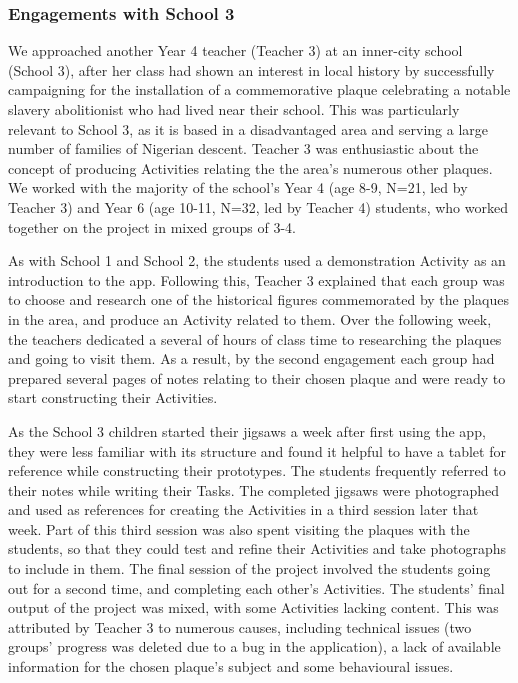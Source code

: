 \documentclass[,hyphens]{sigchi}
\begin{document}
\subsubsection{Engagements with School 3}
We approached another Year 4 teacher (Teacher 3) at an inner-city school (School 3), after her class had shown an interest in local history by successfully campaigning for the installation of a commemorative plaque celebrating a notable slavery abolitionist who had lived near their school. This was particularly relevant to School 3, as it is based in a disadvantaged area and serving a large number of families of Nigerian descent. Teacher 3 was enthusiastic about the concept of producing Activities relating the the area's numerous other plaques. We worked with the majority of the school's Year 4 (age 8-9, N=21, led by Teacher 3) and Year 6 (age 10-11, N=32, led by Teacher 4) students, who worked together on the project in mixed groups of 3-4.

As with School 1 and School 2, the students used a demonstration Activity as an introduction to the app. Following this, Teacher 3 explained that each group was to choose and research one of the historical figures commemorated by the plaques in the area, and produce an Activity related to them. Over the following week, the teachers dedicated a several of hours of class time to researching the plaques and going to visit them. As a result, by the second engagement each group had prepared several pages of notes relating to their chosen plaque and were ready to start constructing their Activities.

As the School 3 children started their jigsaws a week after first using the app, they were less familiar with its structure and found it helpful to have a tablet for reference while constructing their prototypes. The students frequently referred to their notes while writing their Tasks. The completed jigsaws were photographed and used as references for creating the Activities in a third session later that week. Part of this third session was also spent visiting the plaques with the students, so that they could test and refine their Activities and take photographs to include in them. The final session of the project involved the students going out for a second time, and completing each other's Activities. The students' final output of the project was mixed, with some Activities lacking content. This was attributed by Teacher 3 to numerous causes, including technical issues (two groups' progress was deleted due to a bug in the application), a lack of available information for the chosen plaque's subject and some behavioural issues.
\end{document}

